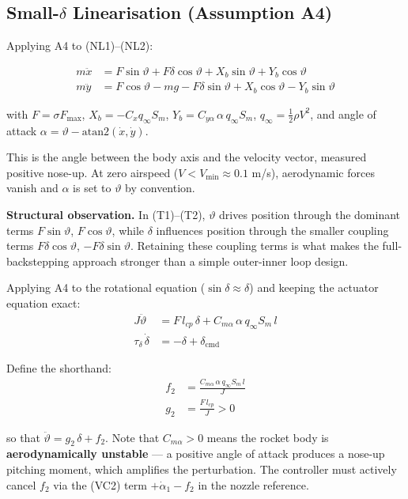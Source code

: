 \documentclass[11pt,a4paper]{article}
\theoremstyle{plain}
\theoremstyle{remark}
\newcommand{\vth}{\vartheta}
\newcommand{\dcmd}{\delta_{\mathrm{cmd}}}
\newcommand{\Fmax}{F_{\max}}
\begin{document}
\subsection{Small-\texorpdfstring{$\delta$}{delta} Linearisation (Assumption A4)}

Applying A4 to (NL1)--(NL2):

\begin{align}
  m\ddot x &= F\sin\vth + F\delta\cos\vth + X_b\sin\vth + Y_b\cos\vth \tag{T1} \\
  m\ddot y &= F\cos\vth - mg - F\delta\sin\vth + X_b\cos\vth - Y_b\sin\vth \tag{T2}
\end{align}

with $F = \sigma\Fmax$, $X_b = -C_x q_\infty S_m$, $Y_b = C_{y\alpha}\,\alpha\,q_\infty S_m$, $q_\infty = \tfrac{1}{2}\rho V^2$, and angle of attack $\alpha = \vth - \mathrm{atan2}(\dot x, \dot y)$.

This is the angle between the body axis and the velocity vector, measured positive nose-up. At zero airspeed ($V < V_{\min} \approx 0.1$ m/s), aerodynamic forces vanish and $\alpha$ is set to $\vth$ by convention.

\textbf{Structural observation.} In (T1)--(T2), $\vth$ drives position through the dominant terms $F\sin\vth$, $F\cos\vth$, while $\delta$ influences position through the smaller coupling terms $F\delta\cos\vth$, $-F\delta\sin\vth$. Retaining these coupling terms is what makes the full-backstepping approach stronger than a simple outer-inner loop design.

Applying A4 to the rotational equation ($\sin\delta \approx \delta$) and keeping the actuator equation exact:
\begin{align}
  J\ddot\vth &= F\,l_{cp}\,\delta + C_{m\alpha}\,\alpha\,q_\infty S_m\,l \tag{R1} \\
  \tau_\delta\,\dot\delta &= -\delta + \dcmd \tag{A1}
\end{align}

Define the shorthand:
\begin{align}
  f_2 &= \frac{C_{m\alpha}\,\alpha\,q_\infty S_m\,l}{J} \\
  g_2 &= \frac{F\,l_{cp}}{J} > 0
\end{align}

so that $\ddot\vth = g_2\,\delta + f_2$. Note that $C_{m\alpha} > 0$ means the rocket body is \textbf{aerodynamically unstable} --- a positive angle of attack produces a nose-up pitching moment, which amplifies the perturbation. The controller must actively cancel $f_2$ via the (VC2) term $+\dot\alpha_1 - f_2$ in the nozzle reference.
\end{document}
